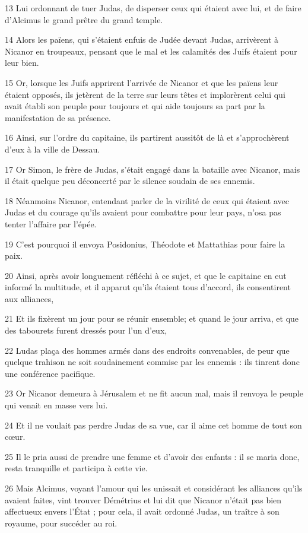\par 13 Lui ordonnant de tuer Judas, de disperser ceux qui étaient avec lui, et de faire d'Alcimus le grand prêtre du grand temple.
\par 14 Alors les païens, qui s'étaient enfuis de Judée devant Judas, arrivèrent à Nicanor en troupeaux, pensant que le mal et les calamités des Juifs étaient pour leur bien.
\par 15 Or, lorsque les Juifs apprirent l'arrivée de Nicanor et que les païens leur étaient opposés, ils jetèrent de la terre sur leurs têtes et implorèrent celui qui avait établi son peuple pour toujours et qui aide toujours sa part par la manifestation de sa présence.
\par 16 Ainsi, sur l'ordre du capitaine, ils partirent aussitôt de là et s'approchèrent d'eux à la ville de Dessau.
\par 17 Or Simon, le frère de Judas, s'était engagé dans la bataille avec Nicanor, mais il était quelque peu déconcerté par le silence soudain de ses ennemis.
\par 18 Néanmoins Nicanor, entendant parler de la virilité de ceux qui étaient avec Judas et du courage qu'ils avaient pour combattre pour leur pays, n'osa pas tenter l'affaire par l'épée.
\par 19 C'est pourquoi il envoya Posidonius, Théodote et Mattathias pour faire la paix.
\par 20 Ainsi, après avoir longuement réfléchi à ce sujet, et que le capitaine en eut informé la multitude, et il apparut qu'ils étaient tous d'accord, ils consentirent aux alliances,
\par 21 Et ils fixèrent un jour pour se réunir ensemble; et quand le jour arriva, et que des tabourets furent dressés pour l'un d'eux,
\par 22 Ludas plaça des hommes armés dans des endroits convenables, de peur que quelque trahison ne soit soudainement commise par les ennemis : ils tinrent donc une conférence pacifique.
\par 23 Or Nicanor demeura à Jérusalem et ne fit aucun mal, mais il renvoya le peuple qui venait en masse vers lui.
\par 24 Et il ne voulait pas perdre Judas de sa vue, car il aime cet homme de tout son cœur.
\par 25 Il le pria aussi de prendre une femme et d'avoir des enfants : il se maria donc, resta tranquille et participa à cette vie.
\par 26 Mais Alcimus, voyant l'amour qui les unissait et considérant les alliances qu'ils avaient faites, vint trouver Démétrius et lui dit que Nicanor n'était pas bien affectueux envers l'État ; pour cela, il avait ordonné Judas, un traître à son royaume, pour succéder au roi.
